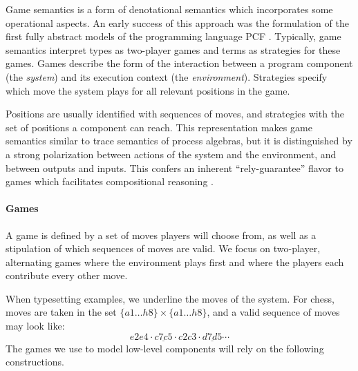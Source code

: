 \documentclass[draft,11pt]{report}
\newcommand{\kw}[1]{\ensuremath{ \mathsf{#1} }}
\newcommand{\que}{\circ}         %
\newcommand{\ans}{\bullet}       %
\begin{document}



Game semantics is a form of denotational semantics which
incorporates some operational aspects.
An early success of this approach was
the formulation of the first fully abstract models
of the programming language PCF \cite{pcfajm,pcfho}.
Typically,
game semantics interpret
types as two-player games
and terms as strategies for these games.
Games describe the form of the interaction
between a program component %
(the \emph{system})
and its execution context
(the \emph{environment}).
Strategies
specify which move the system plays
for all relevant positions in the game.

Positions are usually identified with sequences of moves,
and strategies with the set of positions
a component can reach.
This representation makes
game semantics similar to
trace semantics of process algebras,
but it is distinguished
by a strong polarization between
actions of the system and the environment,
and between outputs and inputs.
This confers an inherent ``rely-guarantee'' flavor
to games which facilitates compositional reasoning
\cite{cspgs}.


\paragraph{Games} \label{sec:mainideas:gs:games} %

A game is defined by a set of moves
players will choose from,
as well as a stipulation of which
sequences of moves are valid.
We focus on two-player, alternating games
where the environment plays first and
where the players
each contribute every other move.

When typesetting examples,
we underline the moves of the system.
For chess,
moves are taken in the set $\{a1 \ldots h8\} \times \{a1 \ldots h8\}$,
and a valid sequence of moves may look like:
\[ e2e4 \cdot \underline{c7c5} \cdot c2c3 \cdot \underline{d7d5} \cdots \]
The games we use to model low-level components
will rely on the following constructions.

\end{document}
